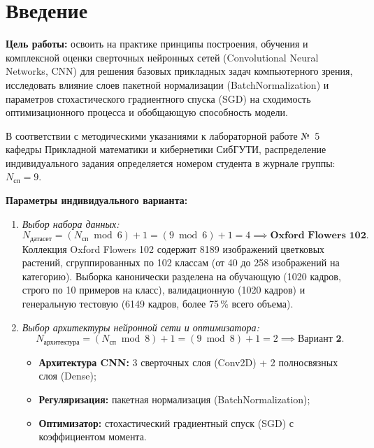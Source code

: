 \chapter*{Введение}

\textbf{Цель работы:} освоить на практике принципы построения, обучения и комплексной оценки сверточных нейронных сетей (Convolutional Neural Networks, CNN) для решения базовых прикладных задач компьютерного зрения, исследовать влияние слоев пакетной нормализации (BatchNormalization) и параметров стохастического градиентного спуска (SGD) на сходимость оптимизационного процесса и обобщающую способность модели.

В соответствии с методическими указаниями к лабораторной работе №~5 кафедры Прикладной математики и кибернетики СибГУТИ, распределение индивидуального задания определяется номером студента в журнале группы: $N_{\text{сп}} = 9$.

\textbf{Параметры индивидуального варианта:}
\begin{enumerate}
    \item \textit{Выбор набора данных:}
    \begin{equation*}
        N_{\text{датасет}} = (N_{\text{сп}} \bmod 6) + 1 = (9 \bmod 6) + 1 = 4 \implies \textbf{Oxford Flowers 102}.
    \end{equation*}
    Коллекция Oxford Flowers 102 содержит 8189 изображений цветковых растений, сгруппированных по 102 классам (от 40 до 258 изображений на категорию). Выборка канонически разделена на обучающую (1020 кадров, строго по 10 примеров на класс), валидационную (1020 кадров) и генеральную тестовую (6149 кадров, более 75\,\% всего объема).
    \item \textit{Выбор архитектуры нейронной сети и оптимизатора:}
    \begin{equation*}
        N_{\text{архитектура}} = (N_{\text{сп}} \bmod 8) + 1 = (9 \bmod 8) + 1 = 2 \implies \textbf{Вариант 2}.
    \end{equation*}
    \begin{itemize}
        \item \textbf{Архитектура CNN:} 3 сверточных слоя (Conv2D) + 2 полносвязных слоя (Dense);
        \item \textbf{Регуляризация:} пакетная нормализация (BatchNormalization);
        \item \textbf{Оптимизатор:} стохастический градиентный спуск (SGD) с коэффициентом момента.
    \end{itemize}
\end{enumerate}

